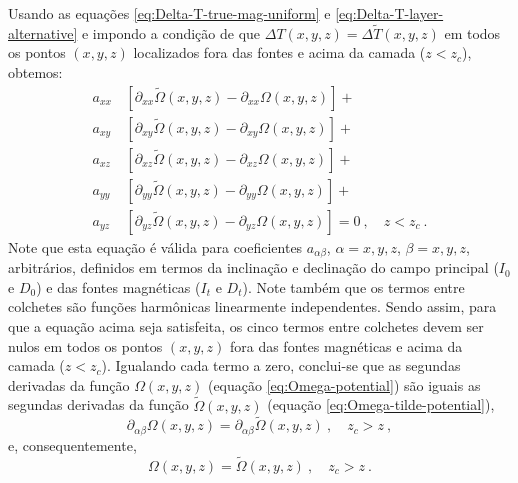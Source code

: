 Usando as equações \ref{eq:Delta-T-true-mag-uniform} e \ref{eq:Delta-T-layer-alternative} e 
impondo a condição de que $\Delta T(x, y, z) = \Delta \tilde{T}(x, y, z)$ em todos os pontos 
$(x, y, z)$ localizados fora das fontes e acima da camada ($z < z_{c}$), obtemos:
\begin{equation}
\begin{split}
a_{xx} \, &\left[\partial_{xx} \tilde{\Omega}(x, y, z) - \partial_{xx} \Omega(x, y, z) \right] + \\
a_{xy} \, &\left[\partial_{xy} \tilde{\Omega}(x, y, z) - \partial_{xy} \Omega(x, y, z) \right] + \\
a_{xz} \, &\left[\partial_{xz} \tilde{\Omega}(x, y, z) - \partial_{xz} \Omega(x, y, z) \right] + \\
a_{yy} \, &\left[\partial_{yy} \tilde{\Omega}(x, y, z) - \partial_{yy} \Omega(x, y, z) \right] + \\
a_{yz} \, &\left[\partial_{yz} \tilde{\Omega}(x, y, z) - \partial_{yz} \Omega(x, y, z) \right] = 0
\: , \quad z < z_{c} \: .
\end{split}
\label{eq:tfanomaly-alternative-equality}
\end{equation}
Note que esta equação é válida para coeficientes $a_{\alpha\beta}$, $\alpha = x, y, z$, $\beta = x, y, z$, 
arbitrários, definidos em termos da inclinação e declinação do campo principal ($I_{0}$ e $D_{0}$) 
e das fontes magnéticas ($I_{t}$ e $D_{t}$). 
Note também que os termos entre colchetes são funções harmônicas linearmente 
independentes. Sendo assim, para que a equação acima seja satisfeita, os cinco termos entre colchetes 
devem ser nulos em todos os pontos $(x,y,z)$ fora das fontes magnéticas e acima da camada ($z < z_{c}$). 
Igualando cada termo a zero, conclui-se que as segundas derivadas da função $\Omega(x, y, z)$
(equação \ref{eq:Omega-potential}) são iguais as segundas derivadas da função 
$\tilde{\Omega}(x, y, z)$ (equação \ref{eq:Omega-tilde-potential}),
\begin{equation}
	\partial_{\alpha\beta} \Omega(x, y, z) = \partial_{\alpha\beta} \tilde{\Omega}(x, y, z)
	\: , \quad z_{c} > z \: ,
	\label{eq:D-alpha-beta-Omega}
\end{equation}
e, consequentemente, 
\begin{equation}
\Omega(x, y, z) = \tilde{\Omega}(x, y, z) \: , \quad z_{c} > z \: .
\label{eq:Omega-Omega-tilde}
\end{equation} 

